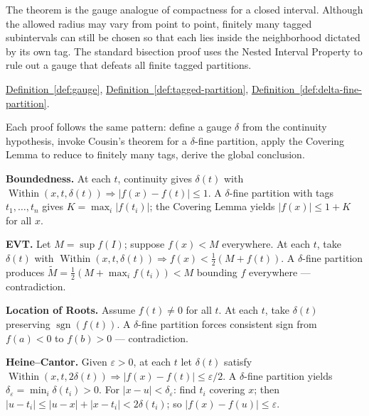 \begin{remark*}[Interpretation]
The theorem is the gauge analogue of compactness for a closed interval.
Although the allowed radius may vary from point to point, finitely many
tagged subintervals can still be chosen so that each lies inside the
neighborhood dictated by its own tag. The standard bisection proof uses
the Nested Interval Property to rule out a gauge that defeats all finite
tagged partitions.
\end{remark*}

\begin{dependencies}
\hyperref[def:gauge]{Definition~\ref*{def:gauge}},
\hyperref[def:tagged-partition]{Definition~\ref*{def:tagged-partition}},
\hyperref[def:delta-fine-partition]{Definition~\ref*{def:delta-fine-partition}}.
\end{dependencies}


\begin{remark*}
Each proof follows the same pattern: define a gauge $\delta$ from
the continuity hypothesis, invoke Cousin's theorem for a $\delta$-fine
partition, apply the Covering Lemma to reduce to finitely many tags,
derive the global conclusion.

\medskip
\textbf{Boundedness.} At each $t$, continuity gives $\delta(t)$ with
$\operatorname{Within}(x,t,\delta(t))\Rightarrow|f(x)-f(t)|\leq 1$.
A $\delta$-fine partition with tags $t_1,\ldots,t_n$ gives
$K=\max_i|f(t_i)|$; the Covering Lemma yields $|f(x)|\leq 1+K$ for
all $x$.

\medskip
\textbf{EVT.} Let $M=\sup f(I)$; suppose $f(x)<M$ everywhere. At
each $t$, take $\delta(t)$ with
$\operatorname{Within}(x,t,\delta(t))\Rightarrow f(x)<\tfrac{1}{2}(M+f(t))$.
A $\delta$-fine partition produces $\widetilde{M}=\tfrac{1}{2}(M+\max_if(t_i))<M$
bounding $f$ everywhere --- contradiction.

\medskip
\textbf{Location of Roots.} Assume $f(t)\neq 0$ for all $t$. At
each $t$, take $\delta(t)$ preserving $\operatorname{sgn}(f(t))$. A
$\delta$-fine partition forces consistent sign from $f(a)<0$ to
$f(b)>0$ --- contradiction.

\medskip
\textbf{Heine--Cantor.} Given $\varepsilon>0$, at each $t$ let
$\delta(t)$ satisfy $\operatorname{Within}(x,t,2\delta(t))
\Rightarrow|f(x)-f(t)|\leq\varepsilon/2$. A $\delta$-fine partition
yields $\delta_\varepsilon=\min_i\delta(t_i)>0$. For $|x-u|<\delta_\varepsilon$:
find $t_i$ covering $x$; then $|u-t_i|\leq|u-x|+|x-t_i|<2\delta(t_i)$;
so $|f(x)-f(u)|\leq\varepsilon$.
\end{remark*}
